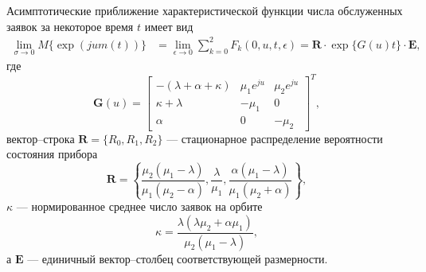\begin{theorem}
	Асимптотические приближение характеристической функции числа обслуженных заявок за некоторое время $t$ имеет вид
	\begin{equation*} \label{theorem_summary}
		\begin{split}
			\lim_{\sigma \xrightarrow{} 0} M\{\exp(jum(t))\} &= \lim_{\epsilon \xrightarrow{} 0} \sum_{k=0}^{2}F_{k}(0,u,t,\epsilon) = \boldsymbol{R} \cdot \exp\{G(u)t\} \cdot \boldsymbol{E},
		\end{split}
	\end{equation*}
	где 
	\begin{equation*}
		\boldsymbol{G}(u)=\begin{bmatrix}
			-(\lambda + \alpha + \kappa) & \mu_{1}e^{ju} &  \mu_{2}e^{ju}\\
			\kappa+\lambda & -\mu_{1} & 0\\
			\alpha & 	0 &	-\mu_{2}
		\end{bmatrix}^{T},
	\end{equation*}
	вектор--строка $\boldsymbol{R}=\{R_{0},R_{1},R_{2}\}$ --- стационарное распределение вероятности состояния прибора
	\begin{equation*}
		\boldsymbol{R}=\left\{\frac{\mu_{2}(\mu_{1} - \lambda)}{\mu_{1}(\mu_{2} - \alpha)},\frac{\lambda}{\mu_{1}},\frac{\alpha(\mu_{1} - \lambda)}{\mu_{1}(\mu_{2} + \alpha)}\right\},
	\end{equation*}
	$\kappa$ --- нормированное среднее число заявок на орбите
	\begin{equation*}
		\kappa = \frac{\lambda(\lambda \mu_{2} + \alpha \mu_{1})}{\mu_{2}(\mu_{1} - \lambda)},
	\end{equation*}
	а $\boldsymbol{E}$ --- единичный вектор--столбец соответствующей размерности.
\end{theorem}
